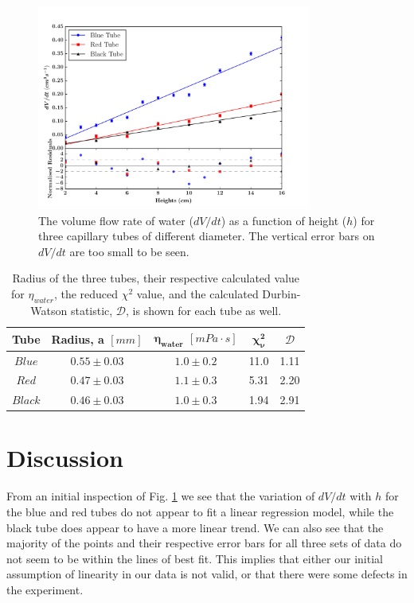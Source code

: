 \documentclass[twocolumn]{revtex4}
\begin{document}
\vspace{-1ex}
\begin{figure}[!h]
\begin{center}
\includegraphics[width=9cm]{fig1-2}
\caption[]{The volume flow rate of water ($dV/dt$) as a function of height ($h$) for three capillary tubes of different diameter. The vertical error bars on $dV/dt$ are too small to be seen.}
\label{fig:fig2}
\end{center}
\end{figure}

\begin{table}[h!]
\centering
\begin{tabular}{ |c|c|c|c|c| } 
 \hline
 \textbf{Tube} & \textbf{Radius, a $[mm]$} & \textbf{$\boldsymbol{\eta_{water}}$ $[mPa\cdot{s}]$} & \textbf{$\boldsymbol{\chi^2_{\nu}}$} & $\mathcal{D}$\\ [0.5ex] 
 \hline\hline
 $Blue$ &$0.55\pm0.03$ & $1.0\pm0.2$ & 11.0 & 1.11\\ 
 $Red$ & $0.47\pm0.03$ & $1.1\pm0.3$ & 5.31 & 2.20\\
 $Black$ & $0.46\pm0.03$ & $1.0\pm0.3$ & 1.94 & 2.91\\
 
 \hline
\end{tabular}
\caption{Radius of the three tubes, their respective calculated value for $\eta_{water}$, the reduced $\chi^2$ value, and the calculated Durbin-Watson statistic, $\mathcal{D}$, is shown for each tube as well.}
\label{table:1}
\end{table}


\vspace{-3ex}
\section{Discussion}
\vspace{-2ex}
From an initial inspection of Fig. \ref{fig:fig2} we see that the variation of $dV/dt$ with $h$ for the blue and red tubes do not appear to fit a linear regression model, while the black tube does appear to have a more linear trend. We can also see that the majority of the points and their respective error bars for all three sets of data do not seem to be within the lines of best fit. This implies that either our initial assumption of linearity in our data is not valid, or that there were some defects in the experiment. 
\end{document}
